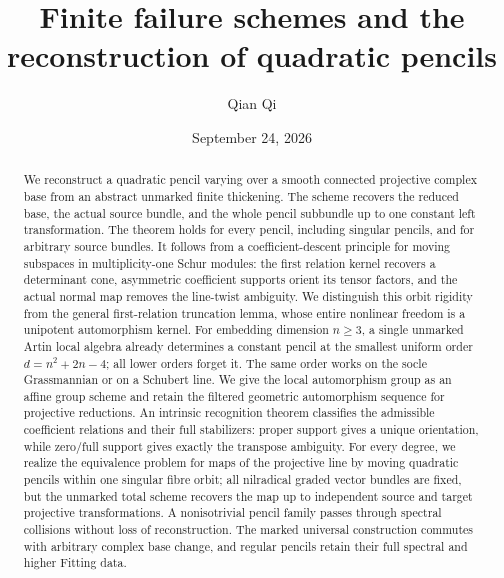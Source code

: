 \title[Finite failure schemes and quadratic pencils]{Finite failure schemes and the reconstruction of quadratic pencils}
\author{Qian Qi}
\date{September 24, 2026}
\begin{abstract}
We reconstruct a quadratic pencil varying over a smooth connected
projective complex base from an abstract unmarked finite thickening.
The scheme recovers the reduced base, the actual source bundle, and
the whole pencil subbundle up to one constant left transformation.
The theorem holds for every pencil, including singular pencils, and
for arbitrary source bundles.  It follows from a coefficient-descent
principle for moving subspaces in multiplicity-one Schur modules:
the first relation kernel recovers a determinant cone, asymmetric
coefficient supports orient its tensor factors, and the actual
normal map removes the line-twist ambiguity.  We distinguish this
orbit rigidity from the general first-relation truncation lemma,
whose entire nonlinear freedom is a unipotent automorphism kernel.
For embedding dimension \(n\ge3\), a single unmarked Artin local
algebra already determines a constant pencil at the smallest uniform
order \(d=n^2+2n-4\); all lower orders forget it.  The same order
works on the socle Grassmannian or on a Schubert line.  We give the
local automorphism group as an affine group scheme and retain the
filtered geometric automorphism sequence for projective reductions.
An intrinsic recognition theorem classifies the admissible coefficient
relations and their full stabilizers: proper support gives a unique
orientation, while zero/full support gives exactly the transpose
ambiguity.  For every degree, we realize the equivalence problem for
maps of the projective line by moving quadratic pencils within one
singular fibre orbit; all nilradical graded vector bundles are fixed,
but the unmarked total scheme recovers the map up to independent
source and target projective transformations.  A nonisotrivial
pencil family passes through spectral collisions without loss of reconstruction.  The marked universal construction commutes
with arbitrary complex base change, and regular pencils retain their
full spectral and higher Fitting data.
\end{abstract}
\maketitle
